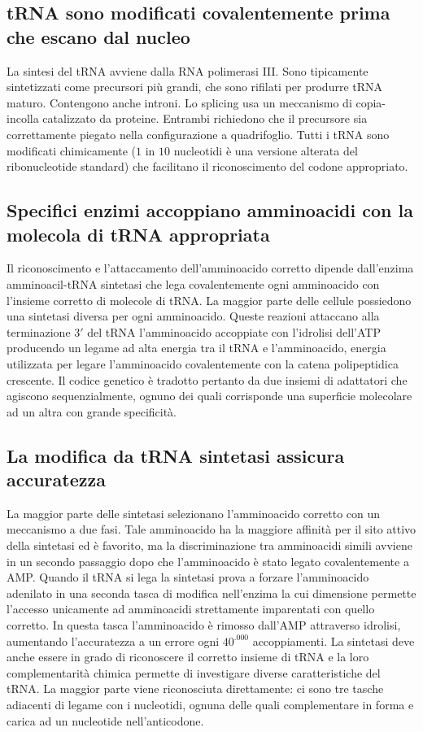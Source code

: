 \subsection{tRNA sono modificati covalentemente prima che escano dal nucleo}
La sintesi del tRNA avviene dalla RNA polimerasi III. Sono tipicamente sintetizzati come precursori pi\`u grandi, che sono rifilati per produrre tRNA maturo. Contengono anche introni. Lo
splicing usa un meccanismo di copia-incolla catalizzato da proteine. Entrambi richiedono che il precursore sia correttamente piegato nella configurazione a quadrifoglio. Tutti i tRNA
sono modificati chimicamente ($1$ in $10$ nucleotidi \`e una versione alterata del ribonucleotide standard) che facilitano il riconoscimento del codone appropriato. 
\subsection{Specifici enzimi accoppiano amminoacidi con la molecola di tRNA appropriata}
Il riconoscimento e l'attaccamento dell'amminoacido corretto dipende dall'enzima amminoacil-tRNA sintetasi che lega covalentemente ogni amminoacido con l'insieme corretto di molecole di
tRNA. La maggior parte delle cellule possiedono una sintetasi diversa per ogni amminoacido. Queste reazioni attaccano alla terminazione $3'$ del tRNA l'amminoacido accoppiate con 
l'idrolisi dell'ATP producendo un legame ad alta energia tra il tRNA e l'amminoacido, energia utilizzata per legare l'amminoacido covalentemente con la catena polipeptidica crescente. 
Il codice genetico \`e tradotto pertanto da due insiemi di adattatori che agiscono sequenzialmente, ognuno dei quali corrisponde una superficie molecolare ad un altra con grande 
specificit\`a.
\subsection{La modifica da tRNA sintetasi assicura accuratezza}
La maggior parte delle sintetasi selezionano l'amminoacido corretto con un meccanismo a due fasi. Tale amminoacido ha la maggiore affinit\`a per il sito attivo della sintetasi ed \`e
favorito, ma la discriminazione tra amminoacidi simili avviene in un secondo passaggio dopo che l'amminoacido \`e stato legato covalentemente a AMP. Quando il tRNA si lega la sintetasi
prova a forzare l'amminoacido adenilato in una seconda tasca di modifica nell'enzima la cui dimensione permette l'accesso unicamente ad amminoacidi strettamente imparentati con quello
corretto. In questa tasca l'amminoacido \`e rimosso dall'AMP attraverso idrolisi, aumentando l'accuratezza a un errore ogni $40^.000$ accoppiamenti. La sintetasi deve anche essere in 
grado di riconoscere il corretto insieme di tRNA e la loro complementarit\`a chimica permette di investigare diverse caratteristiche del tRNA. La maggior parte viene riconosciuta 
direttamente: ci sono tre tasche adiacenti di legame con i nucleotidi, ognuna delle quali complementare in forma e carica ad un nucleotide nell'anticodone. 
